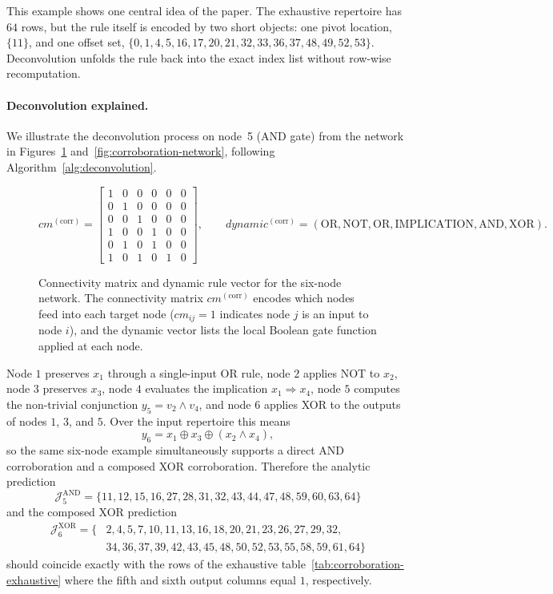 \documentclass[11pt]{article}
\theoremstyle{definition}
\newcommand{\J}{\mathcal{J}}
\begin{document}
This example shows one central idea of the paper. The exhaustive repertoire has \(64\) rows, but the rule itself is encoded by two short objects: one pivot location, \(\{11\}\), and one offset set, \(\{0,1,4,5,16,17,20,21,32,33,36,37,48,49,52,53\}\). Deconvolution unfolds the rule back into the exact index list without row-wise recomputation.

\paragraph{Deconvolution explained.}
We illustrate the deconvolution process on node~5 (AND gate) from the network in
Figures~\ref{fig:corroboration-matrices} and~\ref{fig:corroboration-network},
following Algorithm~\ref{alg:deconvolution}.


\begin{figure}[t]
\centering
\small
\[
cm^{(\mathrm{corr})}=
\begin{bmatrix}
1&0&0&0&0&0\\
0&1&0&0&0&0\\
0&0&1&0&0&0\\
1&0&0&1&0&0\\
0&1&0&1&0&0\\
1&0&1&0&1&0
\end{bmatrix},
\qquad
dynamic^{(\mathrm{corr})}=
(\mathrm{OR},\mathrm{NOT},\mathrm{OR},\mathrm{IMPLICATION},\mathrm{AND},\mathrm{XOR}).
\]
\caption{Connectivity matrix and dynamic rule vector for the six-node network. 
The connectivity matrix \(cm^{(\mathrm{corr})}\) encodes which nodes feed into each target 
node (\(cm_{ij}=1\) indicates node \(j\) is an input to node \(i\)), and the 
dynamic vector lists the local Boolean gate function applied at each node.}
\label{fig:corroboration-matrices}
\end{figure}


Node \(1\) preserves \(x_1\) through a single-input OR rule, node \(2\) applies NOT to \(x_2\), node \(3\) preserves \(x_3\), node \(4\) evaluates the implication \(x_1\Rightarrow x_4\), node \(5\) computes the non-trivial conjunction \(y_5=v_2\land v_4\), and node \(6\) applies XOR to the outputs of nodes \(1\), \(3\), and \(5\). Over the input repertoire this means
\[
y_6=x_1\oplus x_3\oplus (x_2\land x_4),
\]
so the same six-node example simultaneously supports a direct AND corroboration and a composed XOR corroboration. Therefore the analytic prediction
\[
\J_5^{\mathrm{AND}}=\{11,12,15,16,27,28,31,32,43,44,47,48,59,60,63,64\}
\]
and the composed XOR prediction
\[
\begin{aligned}
\J_6^{\mathrm{XOR}}=\{&2,4,5,7,10,11,13,16,18,20,21,23,26,27,29,32,\\
&34,36,37,39,42,43,45,48,50,52,53,55,58,59,61,64\}
\end{aligned}
\]
should coincide exactly with the rows of the exhaustive table~\ref{tab:corroboration-exhaustive} where the fifth and sixth output columns equal \(1\), respectively.
\end{document}
